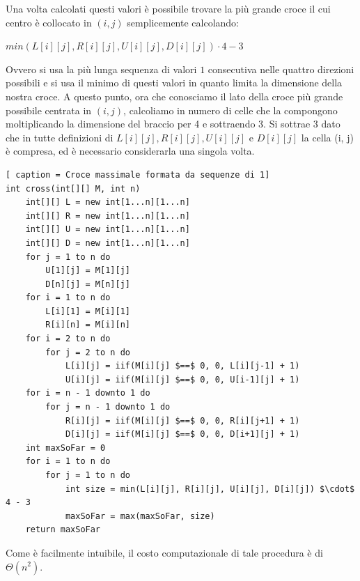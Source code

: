 \documentclass[../cheatSheetAlgoritmi.tex]{subfiles}
\begin{document}
Una volta calcolati questi valori è possibile trovare la più grande croce il cui centro è collocato in $(i, j)$ semplicemente calcolando: 
\begin{center}
$min(L[i][j], R[i][j], U[i][j], D[i][j]) \cdot 4 - 3$
\end{center}
Ovvero si usa la più lunga sequenza di valori $1$ consecutiva nelle quattro direzioni possibili e si usa il minimo di questi valori in quanto limita la dimensione della nostra croce. A questo punto, ora che conosciamo il lato della croce più grande possibile centrata in $(i, j)$, calcoliamo in numero di celle che la compongono moltiplicando la dimensione del braccio per 4 e sottraendo 3. Si sottrae 3 dato che in tutte definizioni di $L[i][j], R[i][j], U[i][j]$ e $D[i][j]$ la cella (i, j) è compresa, ed è necessario considerarla una singola volta.
\begin{lstlisting}[ caption = Croce massimale formata da sequenze di 1]
int cross(int[][] M, int n)
	int[][] L = new int[1...n][1...n]
	int[][] R = new int[1...n][1...n]
	int[][] U = new int[1...n][1...n]
	int[][] D = new int[1...n][1...n]
	for j = 1 to n do
		U[1][j] = M[1][j]
		D[n][j] = M[n][j]
	for i = 1 to n do
		L[i][1] = M[i][1]
		R[i][n] = M[i][n]
	for i = 2 to n do
		for j = 2 to n do
			L[i][j] = iif(M[i][j] $==$ 0, 0, L[i][j-1] + 1)
			U[i][j] = iif(M[i][j] $==$ 0, 0, U[i-1][j] + 1)
	for i = n - 1 downto 1 do
		for j = n - 1 downto 1 do
			R[i][j] = iif(M[i][j] $==$ 0, 0, R[i][j+1] + 1)
			D[i][j] = iif(M[i][j] $==$ 0, 0, D[i+1][j] + 1)
	int maxSoFar = 0
	for i = 1 to n do
		for j = 1 to n do
			int size = min(L[i][j], R[i][j], U[i][j], D[i][j]) $\cdot$ 4 - 3
			maxSoFar = max(maxSoFar, size)
	return maxSoFar
\end{lstlisting}
Come è facilmente intuibile, il costo computazionale di tale procedura è di $\Theta(n^2)$.
\newpage
\end{document}
